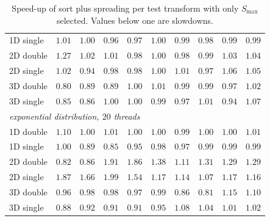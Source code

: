 \begin{table}[p]
\begin{tabular}{lrrrrrrrrr}
        1D single & $1.01$ & $1.00$ & $0.96$ & $0.97$ & $1.00$ & $0.99$ & $0.98$ & $0.99$ & $0.99$ \\
        2D double & $1.27$ & $1.02$ & $1.01$ & $0.98$ & $1.00$ & $0.98$ & $0.99$ & $1.03$ & $1.04$ \\
        2D single & $1.02$ & $0.94$ & $0.98$ & $0.98$ & $1.00$ & $1.01$ & $0.97$ & $1.06$ & $1.05$ \\
        3D double & $0.80$ & $0.89$ & $0.89$ & $1.00$ & $1.01$ & $0.99$ & $0.99$ & $0.97$ & $1.02$ \\
        3D single & $0.85$ & $0.86$ & $1.00$ & $1.00$ & $0.99$ & $0.97$ & $1.01$ & $0.94$ & $1.07$ \\
        \midrule
        \multicolumn{10}{l}{\emph{exponential distribution, $20$ threads}} \\
        1D double & $1.10$ & $1.00$ & $1.01$ & $1.00$ & $1.00$ & $0.99$ & $1.00$ & $1.00$ & $1.01$ \\
        1D single & $1.00$ & $0.89$ & $0.85$ & $0.95$ & $0.98$ & $0.97$ & $0.99$ & $0.99$ & $0.99$ \\
        2D double & $0.82$ & $0.86$ & $1.91$ & $1.86$ & $1.38$ & $1.11$ & $1.31$ & $1.29$ & $1.29$ \\
        2D single & $1.87$ & $1.66$ & $1.99$ & $1.54$ & $1.17$ & $1.14$ & $1.07$ & $1.17$ & $1.16$ \\
        3D double & $0.96$ & $0.98$ & $0.98$ & $0.97$ & $0.99$ & $0.86$ & $0.81$ & $1.15$ & $1.10$ \\
        3D single & $0.88$ & $0.92$ & $0.91$ & $0.91$ & $0.95$ & $1.08$ & $1.04$ & $1.01$ & $1.02$ \\
        \bottomrule
    \end{tabular}
    \caption{Speed-up of sort plus spreading per test transform with only $S_{\max}$ selected. Values below one are slowdowns.}
    \label{tab:app_sp_speedup}
\end{table}

